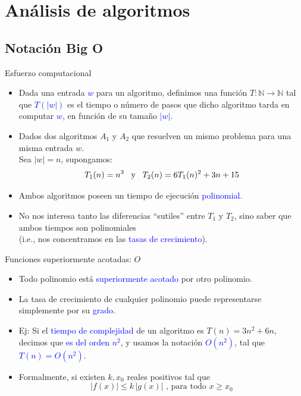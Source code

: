 \documentclass{beamer} %
\newcommand{\blue}[1]{\textcolor{blue}{#1}}
\newcommand{\redb}[1]{{\color{red!70!black}{#1}}}
\begin{document}
\section{Análisis de algoritmos}

\subsection{Notación Big O}

\begin{frame}{Esfuerzo computacional}
  \begin{itemize}
    \item<1-> Dada una entrada \blue{$w$} para un algoritmo, definimos una función $T:\mathbb{N}\to\mathbb{N}$ tal que \blue{$T(|w|)$} es el tiempo o número de pasos que dicho algoritmo tarda en computar \blue{$w$}, en función de su tamaño \blue{$|w|$}.
    \item<2-> Dados dos algoritmos $A_1$ y $A_2$ que resuelven un mismo problema para una misma entrada $w$.\\ Sea $|w|=n$, supongamos:
    $$T_1(n)=n^3\mbox{ \, y \, }T_2(n)=6T_1(n)^2+3n+15$$
    \item<3-> Ambos algoritmos poseen un tiempo de ejecución \blue{polinomial}.
    \item<4-> No nos interesa tanto las diferencias ``sutiles'' entre $T_1$ y $T_2$, sino saber que ambos tiempos son polinomiales\\
    (i.e., nos concentramos en las \blue{tasas de crecimiento}).
  \end{itemize}
\end{frame}

\begin{frame}{Funciones superiormente acotadas: $O$}
  \begin{itemize}
      \item<1-> Todo polinomio está \blue{superiormente acotado} por otro polinomio.
      \item<2-> La tasa de crecimiento de cualquier polinomio puede representarse simplemente por su \blue{grado}.
      \item<3-> Ej: Si el \blue{tiempo de complejidad} de un algoritmo es $T(n)=3n^2+6n$, decimos que \blue{es del orden $n^2$}, y usamos la notación \blue{$O(n^2)$}, tal que \blue{$T(n)=O(n^2)$}.
      \item<4-> Formalmente, 
      \redb{$$f(x)=O(g(x))$$} 
      si existen $k,x_0$ reales positivos tal que 
      $$|f(x)|\leq k\, |g(x)|\mbox{ , para todo } x\geq x_0$$
  \end{itemize}
\end{frame}
\end{document}
